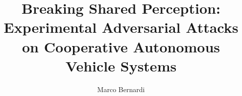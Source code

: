 \title{Breaking Shared Perception: Experimental Adversarial Attacks on Cooperative Autonomous Vehicle Systems}
\author{Marco Bernardi}



